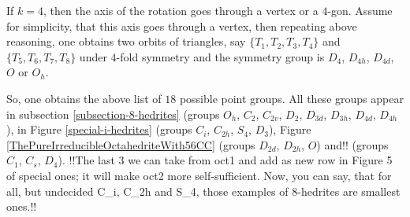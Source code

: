 \documentclass[12pt]{article}
\begin{document}
If $k=4$, then the axis of the rotation goes through a vertex or a $4$-gon. Assume for simplicity, that this axis goes through a vertex, then repeating above reasoning, one obtains two orbits of triangles, say $\{T_1, T_2, T_3, T_4\}$ and $\{T_5, T_6, T_7, T_8\}$ under $4$-fold symmetry and the symmetry group is $D_4$, $D_{4h}$, $D_{4d}$, $O$ or $O_h$.

So, one obtains the above list of $18$ possible point groups. All these groups appear in subsection \ref{subsection-8-hedrites} (groups $O_h$, $C_2$, $C_{2v}$, $D_{2}$, $D_{3d}$, $D_{3h}$, $D_{4d}$, $D_{4h}$), in Figure \ref{special-i-hedrites} (groups $C_{i}$, $C_{2h}$, $S_4$, $D_{3}$), Figure \ref{ThePureIrreducibleOctahedriteWith56CC} (groups $D_{2d}$, $D_{2h}$, $O$) and!!
 \cite{DSt} (groups $C_{1}$, $C_{s}$, $D_{4}$).
!!The last 3 we can take from oct1 and add as new row in Figure
5 of special ones; it will make oct2 more self-sufficient.
Now, you can say, that for all, but undecided C_i, C_{2h} 
and S_4, those examples of 8-hedrites are smallest ones.!!
\end{document}
